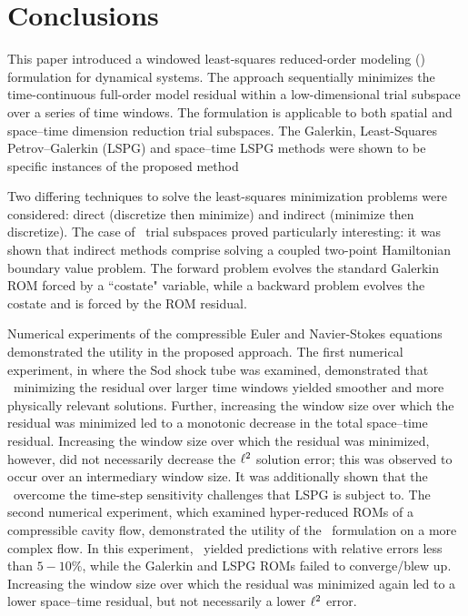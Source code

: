 \documentclass[3p,computermodern,10pt]{elsarticle}
\begin{document}
%
%






\section{Conclusions}\label{sec:conclude}
This paper introduced a windowed least-squares reduced-order modeling (\methodAcronym) formulation for dynamical systems. The approach sequentially minimizes the time-continuous full-order model residual within a low-dimensional trial subspace over a series of time windows. The formulation is applicable to both spatial and space--time dimension reduction trial subspaces. The Galerkin, Least-Squares Petrov--Galerkin (LSPG) and space--time LSPG methods were shown to be specific instances of the proposed method 


Two differing techniques to solve the least-squares minimization problems were considered: direct (discretize then minimize) and indirect (minimize then discretize). 
The case of \spatialAcronym\ trial subspaces proved particularly interesting: it was shown that indirect methods comprise solving a coupled two-point 
Hamiltonian boundary value problem. The forward problem evolves the standard Galerkin ROM forced by a ``costate" variable, while a backward problem evolves the costate and is forced by the ROM residual.

Numerical experiments of the compressible Euler and Navier-Stokes equations demonstrated the utility in the proposed approach. The first numerical experiment, in where the Sod shock tube was examined, demonstrated that \methodAcronymROMs\ minimizing the residual over larger time windows yielded smoother and more physically relevant solutions. Further, increasing the window size over which the residual was minimized led to a monotonic decrease in the total space--time residual. Increasing the window size over which the residual was minimized, however, did not necessarily decrease the $\ell^2$ solution error; this was observed to occur over an intermediary window size. It was 
additionally shown that the \methodAcronymROMs\ overcome the time-step sensitivity challenges that LSPG is subject to. The second numerical experiment, which examined hyper-reduced ROMs of a compressible cavity flow, demonstrated the utility of the \methodAcronym\ formulation on a more complex flow. In this experiment, \methodAcronymROMs\ yielded predictions with relative errors less than $5-10\%$, while the Galerkin and LSPG ROMs failed to converge/blew up. Increasing the window size over which the residual was minimized again led to a lower space--time residual, but not necessarily a lower $\ell^2$ error.
\end{document}
